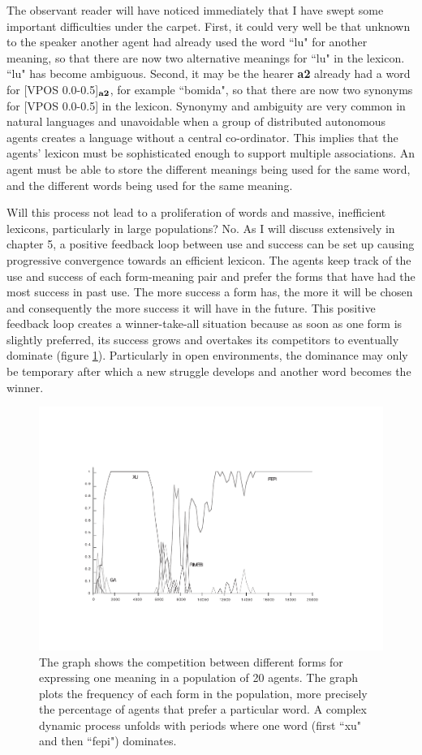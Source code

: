 The observant reader will have noticed immediately that 
I have swept some important difficulties under the carpet. 
First, it could very well be that unknown to the speaker 
another agent had already used the word ``lu" 
for another meaning, so that there are now 
two alternative meanings for ``lu" in the lexicon. ``lu" 
has become ambiguous. Second, it may be the hearer {\bf a2} already 
had a word for [VPOS 0.0-0.5]$_{\bf a2}$, for example ``bomida", 
so that there are now two synonyms for [VPOS 0.0-0.5] in the lexicon. 
Synonymy and ambiguity are very common in 
natural languages and unavoidable when a group of 
distributed autonomous agents creates a language without
a central co-ordinator. This implies that 
the agents' lexicon must be sophisticated enough 
to support multiple associations. An agent must be able to 
store the different meanings being used for the same word, and the 
different words being used for the same meaning. 

Will this process not lead to a proliferation of words and 
massive, inefficient lexicons, particularly in large
populations? No. As I will discuss extensively 
in chapter 5, a positive feedback 
loop between use and success
can be set up causing progressive convergence towards an 
efficient lexicon. The agents keep track of the use and 
success of each form-meaning pair and prefer the forms that have had
the most success in past use. The more success a form has, the more
it will be chosen 
and consequently the more success it will have in the 
future. This positive feedback loop creates a winner-take-all 
situation because as soon as one form is slightly preferred, 
its success grows and overtakes its competitors
to eventually dominate (figure \ref{competition1}). Particularly 
in open environments, the dominance may only be temporary 
after which a new struggle develops and another word 
becomes the winner. 
\begin{figure}[htbp]
  \centerline{\includegraphics[width=.80\textwidth]{chap2/figs/competition-1}}
\caption{\small\label{competition1} 
The graph shows the competition between different forms for
expressing one meaning in a population of 20 agents. The graph plots 
the frequency of each form in the population, more precisely the percentage
of agents that prefer a particular word. A complex dynamic
process unfolds with periods where one word (first ``xu" and then ``fepi") dominates.} 
\end{figure}

